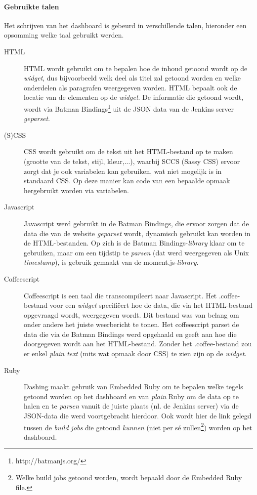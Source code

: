 \documentclass[10pt,a4paper]{article}
\begin{document}
\paragraph{Gebruikte talen}
Het schrijven van het dashboard is gebeurd in verschillende talen, hieronder een opsomming welke taal gebruikt werden.
\begin{description}
\item[HTML] HTML wordt gebruikt om te bepalen hoe de inhoud getoond wordt op de \textit{widget}, dus bijvoorbeeld welk deel als titel zal getoond worden en welke onderdelen als paragrafen weergegeven worden. HTML bepaalt ook de locatie van de elementen op de \textit{widget}. De informatie die getoond wordt, wordt via Batman Bindings\footnote{http://batmanjs.org/} uit de JSON data van de Jenkins server \textit{geparset}.
\item[(S)CSS] CSS wordt gebruikt om de tekst uit het HTML-bestand op te maken (grootte van de tekst, stijl, kleur,...), waarbij SCCS (Sassy CSS) ervoor zorgt dat je ook variabelen kan gebruiken, wat niet mogelijk is in standaard CSS. Op deze manier kan code van een bepaalde opmaak hergebruikt worden via variabelen. 
\item[Javascript] Javascript werd gebruikt in de Batman Bindings, die ervoor zorgen dat de data die van de website \textit{geparset} wordt, dynamisch gebruikt kan worden in de HTML-bestanden. Op zich is de Batman Bindings-\textit{library} klaar om te gebruiken, maar om een tijdstip te \textit{parsen} (dat werd weergegeven als Unix \textit{timestamp}), is gebruik gemaakt van de moment.js-\textit{library}.
\item[Coffeescript] Coffeescript is een taal die transcompileert naar Javascript. Het .coffee-bestand voor een \textit{widget} specifi\"eert hoe de data, die via het HTML-bestand opgevraagd wordt, weergegeven wordt. Dit bestand was van belang om onder andere het juiste weerbericht te tonen. Het coffeescript parset de data die via de Batman Bindings werd opgehaald en geeft aan hoe die doorgegeven wordt aan het HTML-bestand. Zonder het .coffee-bestand zou er enkel \textit{plain text} (mits wat opmaak door CSS) te zien zijn op de \textit{widget}.
\item[Ruby] Dashing maakt gebruik van Embedded Ruby om te bepalen welke tegels getoond worden op het dashboard en van \textit{plain} Ruby om de data op te halen en te \textit{parsen} vanuit de juiste plaats (nl. de Jenkins server) via de JSON-data die werd voortgebracht hierdoor. Ook wordt hier de link gelegd tussen de \textit{build jobs} die getoond \emph{kunnen} (niet per s\'e zullen\footnote{Welke build jobs getoond worden, wordt bepaald door de Embedded Ruby file.}) worden op het dashboard.

\end{description}
\end{document}
